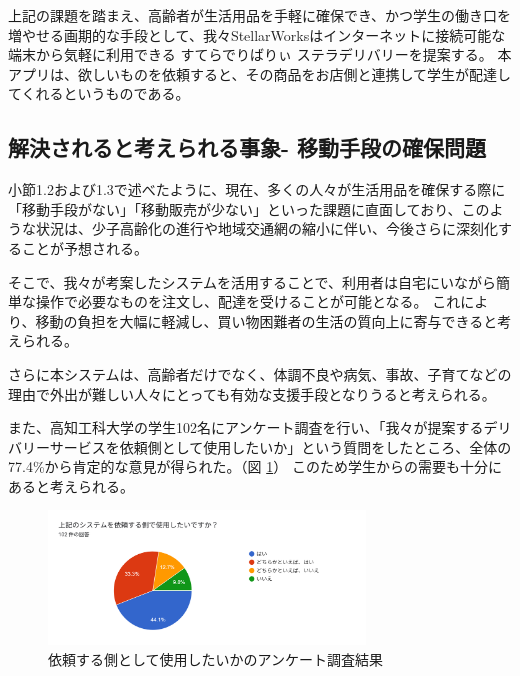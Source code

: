 上記の課題を踏まえ、高齢者が生活用品を手軽に確保でき、かつ学生の働き口を増やせる画期的な手段として、我々StellarWorksはインターネットに接続可能な端末から気軽に利用できる すてらでりばりぃ ステラデリバリーを提案する。
本アプリは、欲しいものを依頼すると、その商品をお店側と連携して学生が配達してくれるというものである。

\subsection{解決されると考えられる事象- 移動手段の確保問題}

小節1.2および1.3で述べたように、現在、多くの人々が生活用品を確保する際に「移動手段がない」「移動販売が少ない」といった課題に直面しており、このような状況は、少子高齢化の進行や地域交通網の縮小に伴い、今後さらに深刻化することが予想される。

そこで、我々が考案したシステムを活用することで、利用者は自宅にいながら簡単な操作で必要なものを注文し、配達を受けることが可能となる。
これにより、移動の負担を大幅に軽減し、買い物困難者の生活の質向上に寄与できると考えられる。

さらに本システムは、高齢者だけでなく、体調不良や病気、事故、子育てなどの理由で外出が難しい人々にとっても有効な支援手段となりうると考えられる。 

また、高知工科大学の学生102名にアンケート調査を行い、「我々が提案するデリバリーサービスを依頼側として使用したいか」という質問をしたところ、全体の77.4\%から肯定的な意見が得られた。（図 \ref{fig:アンケート2}） 
このため学生からの需要も十分にあると考えられる。 

\begin{figure}[H]
  \centering
  \includegraphics[width=0.75\textwidth]{依頼する側として使用したいか_アンケート結果.png}
  \caption{依頼する側として使用したいかのアンケート調査結果}
  \label{fig:アンケート2}
\end{figure}


